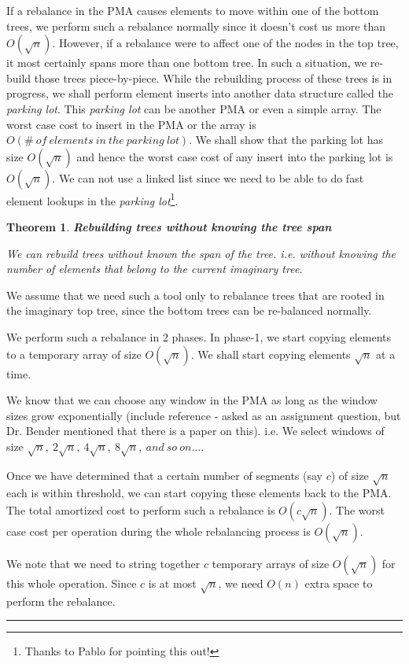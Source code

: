 \documentclass{article}
\newenvironment{proof}{{\bf Proof:  }}{\hfill\rule{2mm}{2mm}}
\newtheorem{theorem}[fact]{Theorem}
\begin{document}
If a rebalance in the PMA causes elements to move within one of the
bottom trees, we perform such a rebalance normally since it doesn't
cost us more than $O(\sqrt{n})$. However, if a rebalance were to
affect one of the nodes in the top tree, it most certainly spans more
than one bottom tree. In such a situation, we re-build those trees
piece-by-piece. While the rebuilding process of these trees is in
progress, we shall perform element inserts into another data structure
called the \textit{parking lot}. This \textit{parking lot} can be
another PMA or even a simple array. The worst case cost to insert in
the PMA or the array is
$O(\#\ of\ elements\ in\ the\ parking\ lot)$. We shall show that the
parking lot has size $O(\sqrt{n})$ and hence the worst case cost of
any insert into the parking lot is $O(\sqrt{n})$. We can not use a
linked list since we need to be able to do fast element lookups in the
\textit{parking lot}\footnote{Thanks to Pablo for pointing this out!}.

\begin{theorem}
\textbf{Rebuilding trees without knowing the tree span}

We can rebuild trees without known the span of the tree. i.e. without
knowing the number of elements that belong to the current imaginary
tree.
\end{theorem}

\begin{proof}
We assume that we need such a tool only to rebalance trees that are
rooted in the imaginary top tree, since the bottom trees can be
re-balanced normally.

We perform such a rebalance in 2 phases. In phase-1, we start copying
elements to a temporary array of size $O(\sqrt{n})$. We shall start
copying elements $\sqrt{n}$ at a time.

We know that we can choose any window in the PMA as long as the window
sizes grow exponentially (include reference - asked as an assignment
question, but Dr. Bender mentioned that there is a paper on
this). i.e. We select windows of size
$\sqrt{n},\ 2\sqrt{n},\ 4\sqrt{n},\ 8\sqrt{n},\ and\ so\ on\ldots{}$.

Once we have determined that a certain number of segments (say $c$) of
size $\sqrt{n}$ each is within threshold, we can start copying these
elements back to the PMA. The total amortized cost to perform such a
rebalance is $O(c\sqrt{n})$. The worst case cost per operation during
the whole rebalancing process is $O(\sqrt{n})$.

We note that we need to string together $c$ temporary arrays of size
$O(\sqrt{n})$ for this whole operation. Since $c$ is at most
$\sqrt{n}$, we need $O(n)$ extra space to perform the rebalance.
\end{proof}
\end{document}
